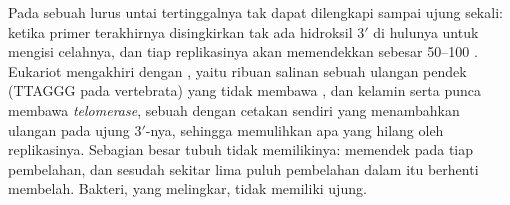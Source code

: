 \begin{proposition}\label{prop:b1:replication-mitosis:telomerase}
Pada sebuah  lurus untai tertinggalnya tak dapat dilengkapi
sampai ujung sekali: ketika primer terakhirnya disingkirkan tak ada
hidroksil $3'$ di hulunya untuk mengisi celahnya, dan tiap replikasinya
akan memendekkan  sebesar \qtyrange{50}{100}{} .
Eukariot mengakhiri  dengan \emph{}, yaitu ribuan
salinan sebuah ulangan pendek (TTAGGG pada vertebrata) yang tidak
membawa , dan  kelamin serta  punca membawa
\emph{telomerase}, sebuah  dengan cetakan  sendiri yang
menambahkan ulangan pada ujung $3'$-nya, sehingga memulihkan apa yang
hilang oleh replikasinya. Sebagian besar  tubuh tidak memilikinya:
 memendek pada tiap pembelahan, dan sesudah sekitar lima
puluh pembelahan dalam  itu berhenti membelah. Bakteri, yang
 melingkar, tidak memiliki ujung.
\end{proposition}


